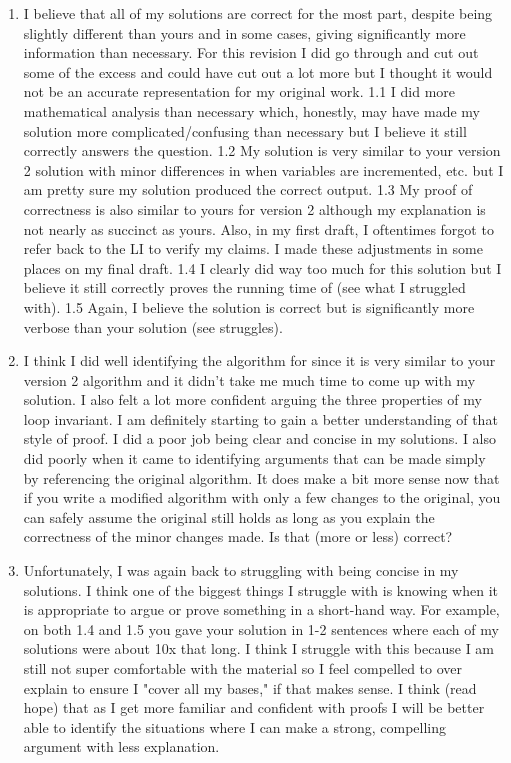 \documentclass[11pt]{article}
\theoremstyle{nonumberplain}
\begin{document}
\begin{enumerate}
\item I believe that all of my solutions are correct for the most part, despite being slightly different than yours and in some cases, giving significantly more information than necessary. For this revision I did go through and cut out some of the excess and could have cut out a lot more but I thought it would not be an accurate representation for my original work. 1.1 I did more mathematical analysis than necessary which, honestly, may have made my solution more complicated/confusing than necessary but I believe it still correctly answers the question. 1.2 My solution is very similar to your version 2 solution with minor differences in when variables are incremented, etc. but I am pretty sure my solution produced the correct output. 1.3 My proof of correctness is also similar to yours for version 2 although my explanation is not nearly as succinct as yours. Also, in my first draft, I oftentimes forgot to refer back to the LI to verify my claims. I made these adjustments in some places on my final draft. 1.4 I clearly did way too much for this solution but I believe it still correctly proves the running time of  (see what I struggled with). 1.5 Again, I believe the solution is correct but is significantly more verbose than your solution (see struggles).  
\item I think I did well identifying the algorithm for  since it is very similar to your version 2 algorithm and it didn't take me much time to come up with my solution. I also felt a lot more confident arguing the three properties of my loop invariant. I am definitely starting to gain a better understanding of that style of proof. I did a poor job being clear and concise in my solutions. I also did poorly when it came to identifying arguments that can be made simply by referencing the original algorithm. It does make a bit more sense now that if you write a modified algorithm with only a few changes to the original, you can safely assume the original still holds as long as you explain the correctness of the minor changes made. Is that (more or less) correct?  
\item Unfortunately, I was again back to struggling with being concise in my solutions. I think one of the biggest things I struggle with is knowing when it is appropriate to argue or prove something in a short-hand way. For example, on both 1.4 and 1.5 you gave your solution in 1-2 sentences where each of my solutions were about 10x that long. I think I struggle with this because I am still not super comfortable with the material so I feel compelled to over explain to ensure I "cover all my bases," if that makes sense. I think (read hope) that as I get more familiar and confident with proofs I will be better able to identify the situations where I can make a strong, compelling argument with less explanation.   

\end{enumerate}
\end{document}
